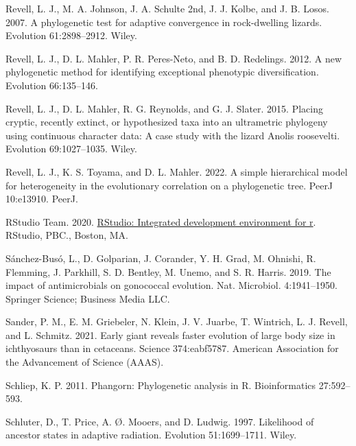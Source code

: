 \documentclass[fleqn,10pt,lineno]{wlpeerj} %
\newlength{\cslhangindent}
\newlength{\cslentryspacingunit} %
\newenvironment{CSLReferences}[2] %
 {%
  \setlength{\parindent}{0pt}
  \ifodd #1
  \let\oldpar\par
  \def\par{\hangindent=\cslhangindent\oldpar}
  \fi
  \setlength{\parskip}{#2\cslentryspacingunit}
 }%
 {}
\begin{document}
\begin{CSLReferences}{1}{0}
\leavevmode{}%
Revell, L. J., M. A. Johnson, J. A. Schulte 2nd, J. J. Kolbe, and J. B. Losos. 2007. A phylogenetic test for adaptive convergence in rock-dwelling lizards. Evolution 61:2898--2912. Wiley.

\leavevmode{}%
Revell, L. J., D. L. Mahler, P. R. Peres-Neto, and B. D. Redelings. 2012. A new phylogenetic method for identifying exceptional phenotypic diversification. Evolution 66:135--146.

\leavevmode{}%
Revell, L. J., D. L. Mahler, R. G. Reynolds, and G. J. Slater. 2015. Placing cryptic, recently extinct, or hypothesized taxa into an ultrametric phylogeny using continuous character data: A case study with the lizard {Anolis} roosevelti. Evolution 69:1027--1035. Wiley.

\leavevmode{}%
Revell, L. J., K. S. Toyama, and D. L. Mahler. 2022. A simple hierarchical model for heterogeneity in the evolutionary correlation on a phylogenetic tree. PeerJ 10:e13910. PeerJ.

\leavevmode{}%
RStudio Team. 2020. \href{http://www.rstudio.com/}{RStudio: Integrated development environment for r}. RStudio, PBC., Boston, MA.

\leavevmode{}%
Sánchez-Busó, L., D. Golparian, J. Corander, Y. H. Grad, M. Ohnishi, R. Flemming, J. Parkhill, S. D. Bentley, M. Unemo, and S. R. Harris. 2019. The impact of antimicrobials on gonococcal evolution. Nat. Microbiol. 4:1941--1950. Springer Science; Business Media LLC.

\leavevmode{}%
Sander, P. M., E. M. Griebeler, N. Klein, J. V. Juarbe, T. Wintrich, L. J. Revell, and L. Schmitz. 2021. Early giant reveals faster evolution of large body size in ichthyosaurs than in cetaceans. Science 374:eabf5787. American Association for the Advancement of Science (AAAS).

\leavevmode{}%
Schliep, K. P. 2011. Phangorn: Phylogenetic analysis in {R}. Bioinformatics 27:592--593.

\leavevmode{}%
Schluter, D., T. Price, A. Ø. Mooers, and D. Ludwig. 1997. Likelihood of ancestor states in adaptive radiation. Evolution 51:1699--1711. Wiley.


\end{CSLReferences}
\end{document}
